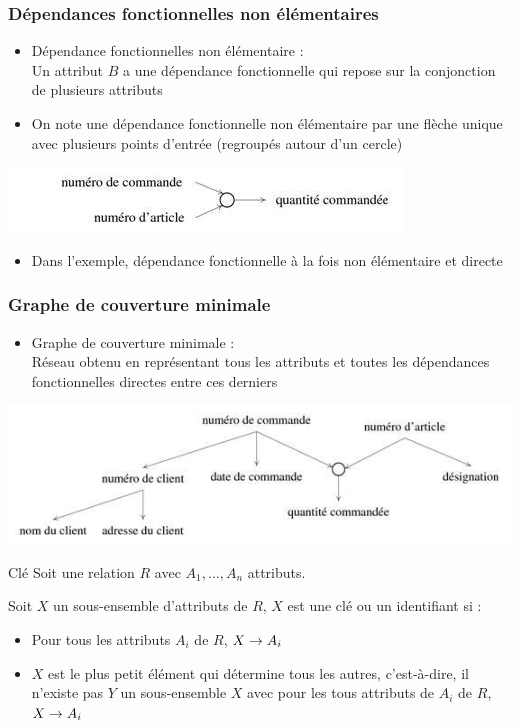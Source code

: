 \begin{frame}
  \frametitle{Dépendances fonctionnelles non élémentaires}
  \begin{itemize}
    \item Dépendance fonctionnelles non élémentaire :\\
      Un attribut $B$ a une dépendance fonctionnelle qui repose sur la conjonction de plusieurs
      attributs
    \item On note une dépendance fonctionnelle non élémentaire par une flèche unique avec plusieurs points
      d'entrée (regroupés autour d'un cercle)
  \end{itemize}
  \begin{center}
    \includegraphics[width=0.9\linewidth]{dependance_fonctionnelle_non_elementaire.jpg}
  \end{center}
  \begin{itemize}
  \item Dans l'exemple, dépendance fonctionnelle à la fois non élémentaire et directe
  \end{itemize}
\end{frame}

\begin{frame}
  \frametitle{Graphe de couverture minimale}
  \begin{itemize}
    \item Graphe de couverture minimale :\\
      Réseau obtenu en représentant tous les attributs et toutes les dépendances fonctionnelles directes entre
      ces derniers
  \end{itemize}
  \begin{center}
    \includegraphics[width=0.9\linewidth]{graphe_couverture_minimale.jpg}
  \end{center}
\end{frame}

\begin{framentitle}{Clé}
    Soit une relation $R$ avec ${A_1, \dots, A_n}$ attributs.

    Soit $X$ un sous-ensemble d'attributs de $R$, $X$ est une clé ou un
    identifiant si :
    \begin{itemize}
        \item Pour tous les attributs $A_i$ de $R$, $X \rightarrow A_i$
        \item $X$ est le plus petit élément qui détermine tous les autres,
            c'est-à-dire, il n'existe pas $Y$ un sous-ensemble $X$ avec pour les
            tous attributs de $A_i$ de $R$, $X \rightarrow A_i$
    \end{itemize}
\end{framentitle}

